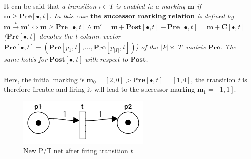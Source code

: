 \documentclass{article}
\begin{document}
	\subparagraph{}It can be said that \textit{a transition $\mathit{t}\in\mathit{T}$ is enabled in a marking $\mathbf{m}$ if $\mathbf{m}\geq\mathbf{Pre}[\bullet,\mathit{t}]$. In this case } \textbf{the successor marking relation} \textit{is defined by $\mathbf{m}\xrightarrow{t}\textbf{m}'\Leftrightarrow \mathbf{m}\geq\mathbf{Pre}[\bullet,t]\land\mathbf{m}'=\mathbf{m}+\mathbf{Post}[\bullet,t]-\mathbf{Pre}[\bullet,t]=\mathbf{m}+\mathbf{C}[\bullet,t]$ ($\mathbf{Pre}[\bullet,t]$ denotes the t-column vector $ \mathbf{Pre}[\bullet,\mathit{t}]=(\mathbf{Pre}[p_{1},t],...,\mathbf{Pre}[p_{|P|},t])$) of the $|P|\times|T|$ matrix $\mathbf{Pre}$. The same holds for $\mathbf{Post}[\bullet,t]$ with respect to $\mathbf{Post}$.}
	\subparagraph{}Here, the initial marking is $\mathbf{m}_{0}=[2,0]>\mathbf{Pre}[\bullet,t]=[1,0]$, the transition \textit{t} is therefore fireable and firing it will lead to the successor marking $\mathbf{m}_{1}=[1,1]$.
	\begin{figure}[h]
		\centering
		\includegraphics[scale=0.6]{net}
		\caption{New P/T net after firing transition $t$}
		\vspace*{-5pt}
	\end{figure}
\end{document}
